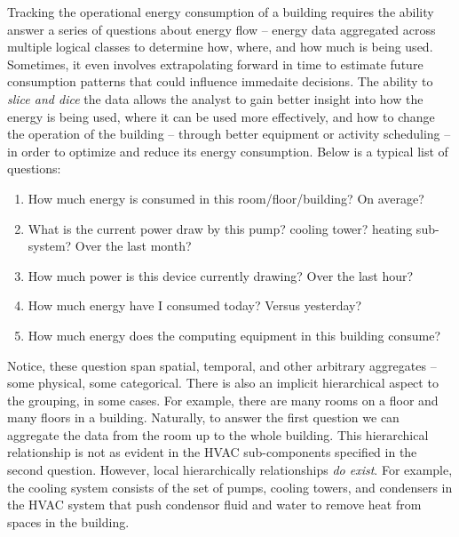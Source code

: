 Tracking the operational energy consumption of a building requires the ability answer a series of questions
about energy flow -- energy data aggregated across multiple logical classes to determine how, where, and how 
much is being used.  Sometimes, it even involves extrapolating forward in time to estimate 
future consumption patterns that could influence immedaite decisions.  The ability to \emph{slice and dice} 
the data allows the analyst
to gain better insight into how the energy is being used, where it can be used more effectively, and how
to change the operation of the building -- through better equipment or activity scheduling -- 
in order to optimize and reduce its energy consumption.
Below is a typical list of questions:

\begin{enumerate}
\item How much energy is consumed in this room/floor/building?  On average?
\item What is the current power draw by this pump? cooling tower? heating sub-system?  Over the last month?
\item How much power is this device currently drawing? Over the last hour?
\item How much energy have I consumed today?  Versus yesterday?
\item How much energy does the computing equipment in this building consume?
\end{enumerate}
\vspace{0.08in}

Notice, these question span spatial, temporal, and other arbitrary aggregates -- some physical, some
categorical.  There is also
an implicit hierarchical aspect to the grouping, in some cases.  For example, there are many
rooms on a floor and many floors in a building.  Naturally, to answer the first question we can
aggregate the data from the room up to the whole building.  This hierarchical relationship
is not as evident in the HVAC sub-components specified in the second question.  However,
local hierarchically relationships \emph{do exist}.  For example, the cooling system consists
of the set of pumps, cooling towers, and condensers in the HVAC system that push condensor
fluid and water to remove heat from spaces in the building.

